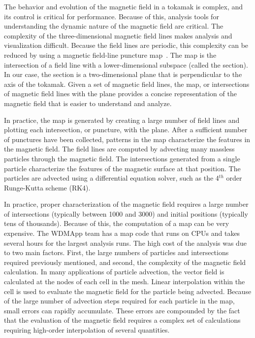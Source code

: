 The behavior and evolution of the magnetic field in a tokamak is complex, and its control is critical for performance.
Because of this, analysis tools for understanding the dynamic nature of the magnetic field are critical.
The complexity of the three-dimensional magnetic field lines makes analysis and visualization difficult.
Because the field lines are periodic, this complexity can be reduced by using a \poincare magnetic field-line puncture map~\cite{Sanderson2010}. 
The \poincare map is the intersection of a field line with a lower-dimensional subspace (called the \poincare section).
In our case, the \poincare section is a two-dimensional plane that is perpendicular to the axis of the tokamak.
Given a set of magnetic field lines, the \poincare map, or intersections of magnetic field lines with the plane provides a concise 
representation of the magnetic field that is easier to understand and analyze.

In practice, the \poincare map is generated by creating a large number of field lines and plotting each intersection, or puncture, with the plane.
After a sufficient number of punctures have been collected, patterns in the map characterize the features in the magnetic field.
The field lines are computed by advecting many massless particles through the magnetic field.
The intersections generated from a single particle characterize the features of the magnetic surface at that position.
The particles are advected using a differential equation solver, such as the 4$^{th}$ order Runge-Kutta scheme (RK4).

In practice, proper characterization of the magnetic field requires a large number of intersections (typically between 1000 and 3000) and initial positions (typically tens of thousands).
Because of this, the computation of a \poincare map can be very expensive.
The WDMApp team has a \poincare map code that runs on CPUs and takes several hours for the largest analysis runs. 
The high cost of the analysis was due to two main factors. First, the large numbers of particles and intersections required previously mentioned, and second, the complexity of the magnetic field calculation.  In many applications of particle advection, the vector field is calculated at the nodes of each cell in the mesh. Linear interpolation within the cell is used to evaluate the magnetic field for the particle being advected. Because of the large number of advection steps required for each particle in the \poincare map, small errors can rapidly accumulate. These errors are compounded by the fact that the evaluation of the magnetic field requires a complex set of calculations requiring high-order interpolation of several quantities.

